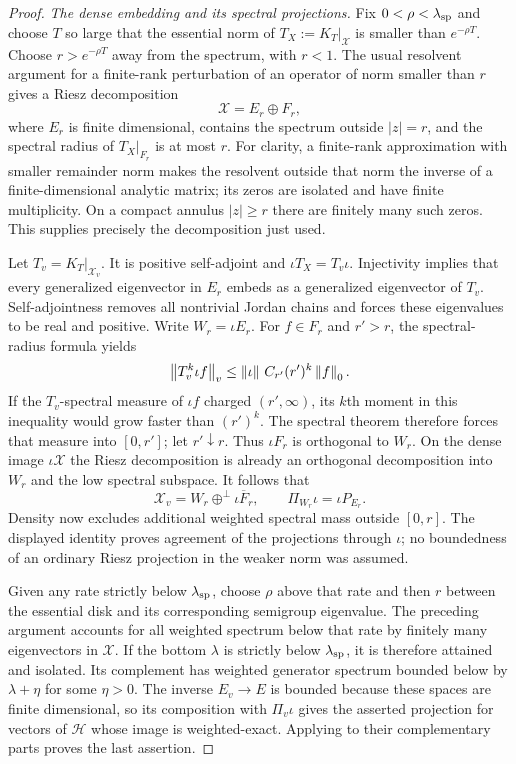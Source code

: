 \begin{proof}
\emph{The dense embedding and its spectral projections.}
Fix $0<\rho<\lambda_{\rm sp}$ and choose $T$ so large that the essential
norm of $T_X:=K_T|_{\mathcal X}$ is smaller than $e^{-\rho T}$.
Choose $r>e^{-\rho T}$ away from the spectrum, with $r<1$.
The usual resolvent argument for a finite-rank perturbation of an
operator of norm smaller than $r$ gives a Riesz decomposition
\[
 \mathcal X=E_r\oplus F_r,
\]
where $E_r$ is finite dimensional, contains the spectrum outside $|z|=r$,
and the spectral radius of $T_X|_{F_r}$ is at most $r$.
For clarity, a finite-rank approximation with smaller remainder norm
makes the resolvent outside that norm the inverse of a finite-dimensional
analytic matrix; its zeros are isolated and have finite multiplicity.
On a compact annulus $|z|\ge r$ there are finitely many such zeros.
This supplies precisely the decomposition just used.

Let $T_v=K_T|_{\mathcal X_v}$.  It is positive self-adjoint and
$\iota T_X=T_v\iota$.  Injectivity implies that every generalized
eigenvector in $E_r$ embeds as a generalized eigenvector of $T_v$.
Self-adjointness removes all nontrivial Jordan chains and forces these
eigenvalues to be real and positive.  Write $W_r=\iota E_r$.
For $f\in F_r$ and $r'>r$, the spectral-radius formula yields
\[
 \left\lVert T_v^k\iota f\right\rVert_v
 \le\left\lVert \iota\right\rVert\,C_{r'}(r')^k\left\lVert f\right\rVert_0.
\]
If the $T_v$-spectral measure of $\iota f$ charged $(r',\infty)$, its
$k$th moment in this inequality would grow faster than $(r')^k$.
The spectral theorem therefore forces that measure into $[0,r']$;
let $r'\downarrow r$.  Thus $\iota F_r$ is orthogonal to $W_r$.
On the dense image $\iota\mathcal X$ the Riesz decomposition is already
an orthogonal decomposition into $W_r$ and the low spectral subspace.
It follows that
\[
 \mathcal X_v=W_r\mathbin{\oplus^{\perp}}
                    \overline{\iota F_r},
 \qquad
 \Pi_{W_r}\iota=\iota P_{E_r}.
\]
Density now excludes additional weighted spectral mass outside $[0,r]$.
The displayed identity proves agreement of the projections through
$\iota$; no boundedness of an ordinary Riesz projection in the weaker
norm was assumed.

Given any rate strictly below $\lambda_{\rm sp}$, choose $\rho$ above
that rate and then $r$ between the essential disk and its corresponding
semigroup eigenvalue.  The preceding argument accounts for all weighted
spectrum below that rate by finitely many eigenvectors in $\mathcal X$.
If the bottom $\lambda$ is strictly below $\lambda_{\rm sp}$, it is
therefore attained and isolated.  Its complement has weighted generator
spectrum bounded below by $\lambda+\eta$ for some $\eta>0$.
The inverse $E_v\to E$ is bounded because these spaces are finite
dimensional, so its composition with $\Pi_v\iota$ gives the asserted
projection for vectors of $\mathcal H$ whose image is weighted-exact.
Applying  to their complementary parts proves the
last assertion.
\end{proof}

